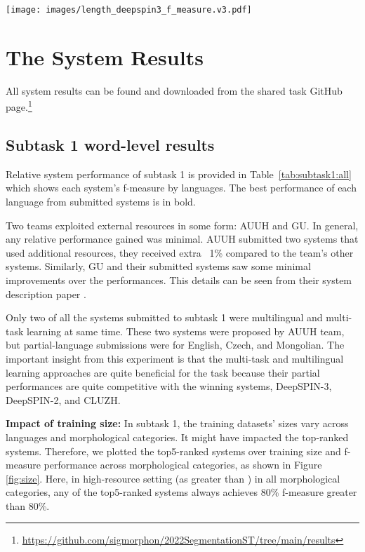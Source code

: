 \documentclass[11pt]{article}
\begin{document}
\begin{figure*}[!h]
\begin{center}
\texttt{[image: images/length\_deepspin3\_f\_measure.v3.pdf]}
\caption{Impact of word length over languages and morphological categories: Results from DeepSPIN-3, the winning system of subtask 1, word-level morpheme segmentation}
\label{fig:word_len}
\end{center}
\end{figure*}

\section{The System Results}
All system results can be found and downloaded from the shared task GitHub page.\footnote{\url{https://github.com/sigmorphon/2022SegmentationST/tree/main/results}}

\subsection{Subtask 1 word-level results}
Relative system performance of subtask 1 is provided in Table~\ref{tab:subtask1:all} which shows each system's f-measure by languages. The best performance of each language from submitted systems is in bold. 

Two teams exploited external resources in some form: AUUH and GU. In general, any relative performance gained was minimal. AUUH submitted two systems that used additional resources, they received extra ~1\% compared to the team's other systems. Similarly, GU and their submitted systems saw some minimal improvements over the performances. This details can be seen from their system description paper \cite{GU2022}. 

Only two of all the systems submitted to subtask 1 were multilingual and multi-task learning at same time. These two systems were proposed by AUUH team, but partial-language submissions were for English, Czech, and Mongolian. The important insight from this experiment is that the multi-task and multilingual learning approaches are quite beneficial for the task because their partial performances are quite competitive with the winning systems, DeepSPIN-3, DeepSPIN-2, and CLUZH. 




\vspace{1em} \noindent \textbf{Impact of training size:} In subtask 1, the training datasets' sizes vary across languages and morphological categories. It might have impacted the top-ranked systems. Therefore, we plotted the top5-ranked systems over training size and f-measure performance across morphological categories, as shown in Figure \ref{fig:size}. Here, in high-resource setting (as greater than ) in all morphological categories, any of the top5-ranked systems always achieves 80\% f-measure greater than 80\%. 
\end{document}
